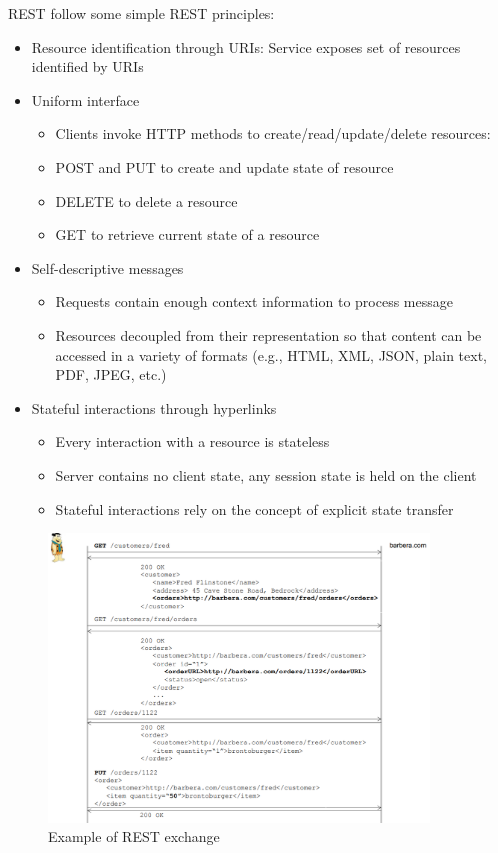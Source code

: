 \documentclass[10pt,a4paper]{report}
\begin{document}
REST follow some simple REST principles:
\begin{itemize}
	\item  Resource identification through URIs: Service exposes set of resources identified by URIs
	\item  Uniform interface
		\begin{itemize}
			\item Clients invoke HTTP methods to create/read/update/delete resources:
			\item POST and PUT to create and update state of resource
			\item DELETE to delete a resource
			\item GET to retrieve current state of a resource
		\end{itemize}

	\item Self-descriptive messages 
		\begin{itemize}
			\item Requests contain enough context information to process message
			\item Resources decoupled from their representation so that content can be accessed in a
			variety of formats (e.g., HTML, XML, JSON, plain text, PDF, JPEG, etc.)
		\end{itemize}

	\item Stateful interactions through hyperlinks
		\begin{itemize}
			\item Every interaction with a resource is stateless
			\item Server contains no client state, any session state is held on the client
			\item Stateful interactions rely on the concept of explicit state transfer
		\end{itemize}

\end{itemize}
\begin{figure}[h]
	\centering
	\includegraphics[width=0.9\textwidth]{image66}
	\caption{Example of REST exchange}
	\label{image66}
\end{figure} 
\end{document}
